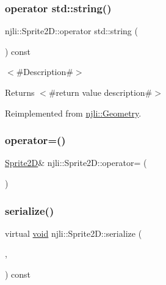 \subsubsection{\texorpdfstring{operator std\+::string()}{operator std::string()}}
{\footnotesize\ttfamily njli\+::\+Sprite2\+D\+::operator std\+::string (\begin{DoxyParamCaption}{ }\end{DoxyParamCaption}) const\hspace{0.3cm}{\ttfamily [virtual]}}

$<$\#\+Description\#$>$

\begin{DoxyReturn}{Returns}
$<$\#return value description\#$>$ 
\end{DoxyReturn}


Reimplemented from \mbox{\hyperlink{classnjli_1_1_geometry_ae678ad91efebe665fc2f5533dc26fe24}{njli\+::\+Geometry}}.

\mbox{\label{classnjli_1_1_sprite2_d_a37931c43c6f6cd71930c4c09186742ef}} 
\subsubsection{\texorpdfstring{operator=()}{operator=()}}
{\footnotesize\ttfamily \mbox{\hyperlink{classnjli_1_1_sprite2_d}{Sprite2D}}\& njli\+::\+Sprite2\+D\+::operator= (\begin{DoxyParamCaption}\item[{const \mbox{\hyperlink{classnjli_1_1_sprite2_d}{Sprite2D}} \&}]{ }\end{DoxyParamCaption})\hspace{0.3cm}{\ttfamily [protected]}}

\mbox{\label{classnjli_1_1_sprite2_d_ae372ea409ac67b1585e7928bffe5f502}} 
\subsubsection{\texorpdfstring{serialize()}{serialize()}}
{\footnotesize\ttfamily virtual \mbox{\hyperlink{_thread_8h_af1e856da2e658414cb2456cb6f7ebc66}{void}} njli\+::\+Sprite2\+D\+::serialize (\begin{DoxyParamCaption}\item[{\mbox{\hyperlink{_thread_8h_af1e856da2e658414cb2456cb6f7ebc66}{void}} $\ast$}]{,  }\item[{bt\+Serializer $\ast$}]{ }\end{DoxyParamCaption}) const\hspace{0.3cm}{\ttfamily [virtual]}}

